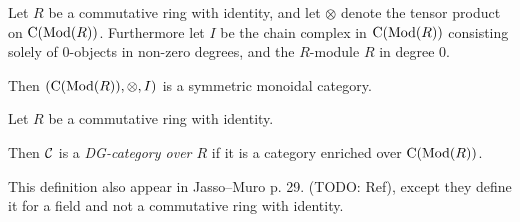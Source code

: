             


\begin{fact}[nlab]
    Let \( R \) be a commutative ring with identity, and let \( \otimes \) denote the tensor product on \( \operatorname{C} (\operatorname{Mod}(R)) \). Furthermore let \( I \) be the chain complex in \( \operatorname{C} (\operatorname{Mod}(R)) \) consisting solely of \( 0 \)-objects in non-zero degrees, and the \( R \)-module \( R \) in degree 0. 

    Then \( (\operatorname{C} (\operatorname{Mod}(R)), \otimes, I) \) is a symmetric monoidal category.
\end{fact}

\begin{definition}%
    Let \( R \) be a commutative ring with identity.

    Then \( {\mathcal{C}} \) is a \emph{DG-category over \( R \)} if it is a category enriched over \( \operatorname{C} (\operatorname{Mod}(R)) \).
\end{definition}
This definition also appear in Jasso--Muro p. 29. (TODO: Ref), except they define it for a field and not a commutative ring with identity.


